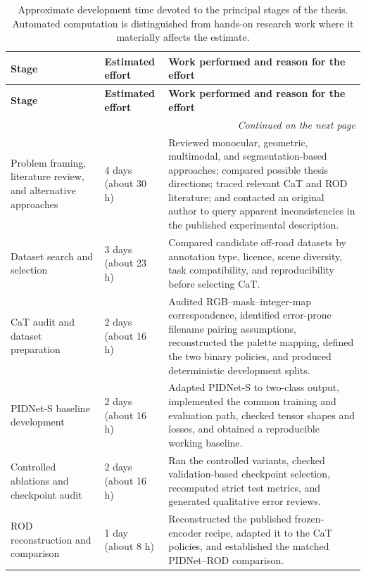 \begingroup
\small
\begin{longtable}{@{}p{}p{}p{}@{}}
\caption[Development-time breakdown.]{Approximate development time devoted to
the principal stages of the thesis. Automated computation is distinguished
from hands-on research work where it materially affects the estimate.}
\label{tab:development_time} \\
\toprule
\textbf{Stage} & \textbf{Estimated effort} & \textbf{Work performed and reason for the effort} \\
\midrule
\endfirsthead
\toprule
\textbf{Stage} & \textbf{Estimated effort} & \textbf{Work performed and reason for the effort} \\
\midrule
\endhead
\midrule
\multicolumn{3}{r}{\textit{Continued on the next page}} \\
\endfoot
\bottomrule
\endlastfoot
Problem framing, literature review, and alternative approaches &
4 days (about 30 h) &
Reviewed monocular, geometric, multimodal, and segmentation-based approaches;
compared possible thesis directions; traced relevant CaT and ROD literature;
and contacted an original author to query apparent inconsistencies in the
published experimental description. \\

Dataset search and selection &
3 days (about 23 h) &
Compared candidate off-road datasets by annotation type, licence, scene
diversity, task compatibility, and reproducibility before selecting CaT. \\

CaT audit and dataset preparation &
2 days (about 16 h) &
Audited RGB--mask--integer-map correspondence, identified error-prone filename
pairing assumptions, reconstructed the palette mapping, defined the two binary
policies, and produced deterministic development splits. \\

PIDNet-S baseline development &
2 days (about 16 h) &
Adapted PIDNet-S to two-class output, implemented the common training and
evaluation path, checked tensor shapes and losses, and obtained a reproducible
working baseline. \\

Controlled ablations and checkpoint audit &
2 days (about 16 h) &
Ran the controlled variants, checked validation-based checkpoint selection,
recomputed strict test metrics, and generated qualitative error reviews. \\

ROD reconstruction and comparison &
1 day (about 8 h) &
Reconstructed the published frozen-encoder recipe, adapted it to the CaT
policies, and established the matched PIDNet--ROD comparison. \\


\end{longtable}
